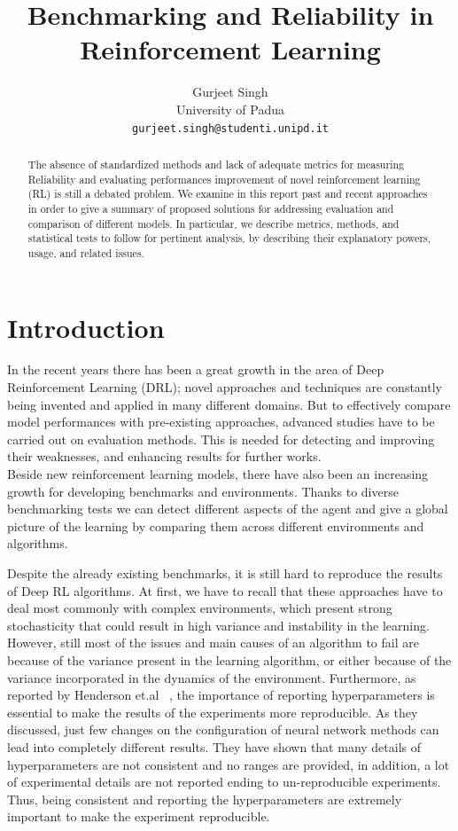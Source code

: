 \documentclass{article}
\title{Benchmarking and Reliability in Reinforcement Learning}
\author{Gurjeet Singh\\
  University of Padua\\
  \texttt{gurjeet.singh@studenti.unipd.it}
}
\begin{document}
\maketitle

\begin{abstract}
The absence of standardized methods and lack of adequate metrics for measuring Reliability and evaluating performances improvement of novel reinforcement learning (RL) is still a debated problem.
We examine in this report past and recent approaches in order to give a summary of proposed solutions for addressing evaluation and comparison of different models. In particular, we describe metrics, methods, and statistical tests to follow for pertinent analysis, by describing their explanatory powers, usage, and related issues.
	
\end{abstract}

\section{Introduction}
In the recent years there has been a great growth in the area of Deep Reinforcement Learning (DRL); novel approaches and techniques are constantly being invented and applied in many different domains.
But to effectively compare model performances with pre-existing approaches, advanced studies have to be carried out on evaluation methods.  This is needed for detecting and improving their weaknesses, and enhancing results for further works.\\
Beside new reinforcement learning models, there have also been an increasing growth for developing benchmarks and environments.
Thanks to diverse benchmarking tests we can detect different aspects of the agent and give a global picture of the learning by comparing them across different environments and algorithms.

Despite the already existing benchmarks, it is still hard to reproduce the results of Deep RL algorithms. At first, we have to recall that these approaches have to deal most commonly with complex environments, which present strong stochasticity that could result in high variance and instability in the learning. However, still most of the issues and main causes of an algorithm to fail are because of the variance present in the learning algorithm, or either because of the variance incorporated in the dynamics of the environment.
Furthermore, as reported by Henderson et.al ~\cite{DRL01}, the importance of reporting hyperparameters is essential to make the results of the experiments more reproducible. As they discussed, just few changes on the configuration of neural network methods can lead into completely different results. They have shown that many details of hyperparameters are not consistent and no ranges are provided, in addition, a lot of experimental details are not reported ending to un-reproducible experiments. Thus, being consistent and reporting the hyperparameters are extremely important to make the experiment reproducible.
\end{document}
